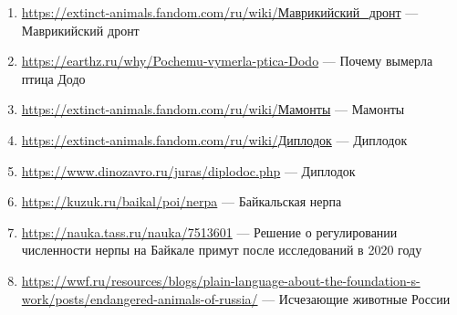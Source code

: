 \documentclass[12pt]{article}
\begin{document}
    \begin{enumerate}
        \item \href{https://extinct-animals.fandom.com/ru/wiki/\%D0\%9C\%D0\%B0\%D0\%B2\%D1\%80\%D0\%B8\%D0\%BA\%D0\%B8\%D0\%B9\%D1\%81\%D0\%BA\%D0\%B8\%D0\%B9_\%D0\%B4\%D1\%80\%D0\%BE\%D0\%BD\%D1\%82}{https://extinct-animals.fandom.com/ru/wiki/Маврикийский\_дронт} --- Маврикийский дронт
        \item
        \href{https://earthz.ru/why/Pochemu-vymerla-ptica-Dodo}{https://earthz.ru/why/Pochemu-vymerla-ptica-Dodo} --- Почему вымерла птица Додо
        \item
        \href{https://extinct-animals.fandom.com/ru/wiki/\%D0\%9C\%D0\%B0\%D0\%BC\%D0\%BE\%D0\%BD\%D1\%82\%D1\%8B}{https://extinct-animals.fandom.com/ru/wiki/Мамонты} --- Мамонты
        \item
        \href{https://extinct-animals.fandom.com/ru/wiki/\%D0\%94\%D0\%B8\%D0\%BF\%D0\%BB\%D0\%BE\%D0\%B4\%D0\%BE\%D0\%BA}{https://extinct-animals.fandom.com/ru/wiki/Диплодок} --- Диплодок
        \item
        \href{https://www.dinozavro.ru/juras/diplodoc.php}{https://www.dinozavro.ru/juras/diplodoc.php} --- Диплодок
        \item
        \href{https://kuzuk.ru/baikal/poi/nerpa}{https://kuzuk.ru/baikal/poi/nerpa} --- Байкальская нерпа
        \item
        \href{https://nauka.tass.ru/nauka/7513601}{https://nauka.tass.ru/nauka/7513601} --- Решение о регулировании численности нерпы на Байкале примут после исследований в 2020 году
        \item
        \href{https://wwf.ru/resources/blogs/plain-language-about-the-foundation-s-work/posts/endangered-animals-of-russia/}{https://wwf.ru/resources/blogs/plain-language-about-the-foundation-s-work/posts/endangered-animals-of-russia/} --- Исчезающие животные России
    \end{enumerate}
\end{document}
